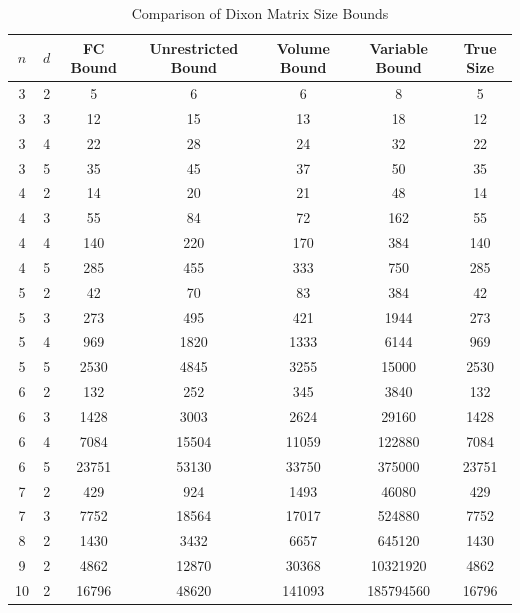 \begin{table}[htbp]
	\centering
	\caption{Comparison of Dixon Matrix Size Bounds}
	\label{tab:dixon_matrix_comparison}
	\begin{tabular}{ccccccc}
		\toprule
		$n$ & $d$ & FC Bound & Unrestricted Bound & Volume Bound & Variable Bound & True Size \\
		\midrule
		3 & 2 & 5 & 6 & 6 & 8 & 5 \\
		3 & 3 & 12 & 15 & 13 & 18 & 12 \\
		3 & 4 & 22 & 28 & 24 & 32 & 22 \\
		3 & 5 & 35 & 45 & 37 & 50 & 35 \\
		
		4 & 2 & 14 & 20 & 21 & 48 & 14 \\
		4 & 3 & 55 & 84 & 72 & 162 & 55 \\
		4 & 4 & 140 & 220 & 170 & 384 & 140 \\
		4 & 5 & 285 & 455 & 333 & 750 & 285 \\
		
		5 & 2 & 42 & 70 & 83 & 384 & 42 \\
		5 & 3 & 273 & 495 & 421 & 1944 & 273 \\
		5 & 4 & 969 & 1820 & 1333 & 6144 & 969 \\
		5 & 5 & 2530 & 4845 & 3255 & 15000 & 2530 \\
		
		6 & 2 & 132 & 252 & 345 & 3840 & 132 \\
		6 & 3 & 1428 & 3003 & 2624 & 29160 & 1428 \\
		6 & 4 & 7084 & 15504 & 11059 & 122880 & 7084 \\
		6 & 5 & 23751 & 53130 & 33750 & 375000 & 23751 \\
		
		7 & 2 & 429 & 924 & 1493 & 46080 & 429 \\
		7 & 3 & 7752 & 18564 & 17017 & 524880 & 7752 \\
		
		8 & 2 & 1430 & 3432 & 6657 & 645120 & 1430 \\
		
		9 & 2 & 4862 & 12870 & 30368 & 10321920 & 4862 \\
		
		10 & 2 & 16796 & 48620 & 141093 & 185794560 & 16796 \\
		
		\bottomrule
	\end{tabular}
\end{table}

